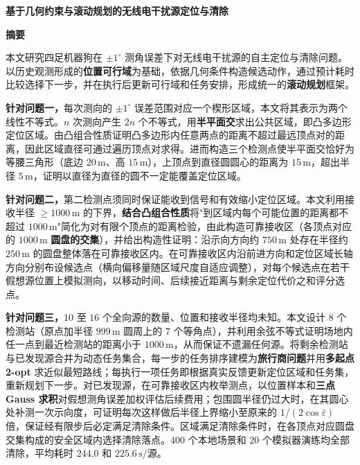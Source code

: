 \thispagestyle{plain}
\begin{center}
{\fontsize{16pt}{20pt}\selectfont\bfseries 基于几何约束与滚动规划的无线电干扰源定位与清除\par}
\vspace{5pt}
\end{center}
\vspace{12pt}
\begin{center}
{\fontsize{14pt}{17pt}\selectfont\bfseries 摘\quad 要\par}
\end{center}
\vspace{4pt}

本文研究四足机器狗在 $\pm1^\circ$ 测角误差下对无线电干扰源的自主定位与清除问题。以历史观测形成的\textbf{位置可行域}为基础，依据几何条件构造候选动作，通过预计耗时比较选择下一步，并在执行后更新可行域和任务安排，形成统一的\textbf{滚动规划}框架。

\textbf{针对问题一，}每次测向的 $\pm1^\circ$ 误差范围对应一个楔形区域，本文将其表示为两个线性不等式。$n$ 次测向产生 $2n$ 个不等式，用\textbf{半平面交}求出公共区域，即凸多边形定位区域。由凸组合性质证明凸多边形内任意两点的距离不超过最远顶点对的距离，因此区域直径可通过遍历顶点对求得。进而构造三个检测点使半平面交恰好为等腰三角形（底边 $20\,\mathrm{m}$、高 $15\,\mathrm{m}$），上顶点到直径圆圆心的距离为 $15\,\mathrm{m}$，超出半径 $5\,\mathrm{m}$，证明以直径为直径的圆不一定能覆盖定位区域。

\textbf{针对问题二，}第二检测点须同时保证能收到信号和有效缩小定位区域。本文利用接收半径 $\ge1000\,\mathrm{m}$ 的下界，\textbf{结合凸组合性质}将"到区域内每个可能位置的距离都不超过 $1000\,\mathrm{m}$"简化为对有限个顶点的距离检验，由此构造可靠接收区（各顶点对应的 $1000\,\mathrm{m}$ \textbf{圆盘的交集}），并给出构造性证明：沿示向方向约 $750\,\mathrm{m}$ 处存在半径约 $250\,\mathrm{m}$ 的圆盘整体落在可靠接收区内。在可靠接收区内沿前进方向和定位区域长轴方向分别布设候选点（横向偏移量随区域尺度自适应调整），对每个候选点在若干假想源位置上模拟测向，以移动时间、后续接近距离与剩余定位代价之和评分选点。

\textbf{针对问题三，}$10$ 至 $16$ 个全向源的数量、位置和接收半径均未知。本文设计 $8$ 个检测站（原点加半径 $999\,\mathrm{m}$ 圆周上的 $7$ 个等角点），并利用余弦不等式证明场地内任一点到最近检测站的距离小于 $1000\,\mathrm{m}$，从而保证不遗漏任何源。将剩余检测站与已发现源合并为动态任务集合，每一步的任务排序建模为\textbf{旅行商问题}并用\textbf{多起点 2-opt} 求近似最短路线；每执行一项任务即根据真实反馈更新定位区域和任务集，重新规划下一步。对已发现源，在可靠接收区内枚举测点，以位置样本和\textbf{三点 Gauss 求积}对假想测角误差加权评估后续费用；包围圆半径仍过大时，在其圆心处补测一次示向度，可证明每次这样做后半径上界缩小至原来的 $1/(2\cos\bar\varepsilon)$ 倍，保证经有限步后必定满足清除条件。区域满足清除条件时，在各顶点对应圆盘交集构成的安全区域内选择清除落点。$400$ 个本地场景和 $20$ 个模拟器演练均全部清除，平均耗时 $244.0$ 和 $225.6\,\mathrm{s}/\text{源}$。

